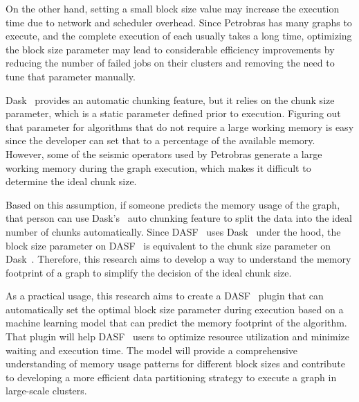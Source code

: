 On the other hand, setting a small block size value may increase the execution time due to network and scheduler overhead.
Since Petrobras has many graphs to execute, and the complete execution of each usually takes a long time, optimizing the block size parameter may lead to considerable efficiency improvements by reducing the number of failed jobs on their clusters and removing the need to tune that parameter manually.

Dask~\cite{dask} provides an automatic chunking feature, but it relies on the chunk size parameter, which is a static parameter defined prior to execution.
Figuring out that parameter for algorithms that do not require a large working memory is easy since the developer can set that to a percentage of the available memory.
However, some of the seismic operators used by Petrobras generate a large working memory during the graph execution, which makes it difficult to determine the ideal chunk size.

Based on this assumption, if someone predicts the memory usage of the graph, that person can use Dask's~\cite{dask} auto chunking feature to split the data into the ideal number of chunks automatically.
Since \ac{DASF}~\cite{dasf} uses Dask~\cite{dask} under the hood, the block size parameter on \ac{DASF}~\cite{dasf} is equivalent to the chunk size parameter on Dask~\cite{dask}.
Therefore, this research aims to develop a way to understand the memory footprint of a graph to simplify the decision of the ideal chunk size.

As a practical usage, this research aims to create a \ac{DASF}~\cite{dasf} plugin that can automatically set the optimal block size parameter during execution based on a machine learning model that can predict the memory footprint of the algorithm.
That plugin will help \ac{DASF}~\cite{dasf} users to optimize resource utilization and minimize waiting and execution time.
The model will provide a comprehensive understanding of memory usage patterns for different block sizes and contribute to developing a more efficient data partitioning strategy to execute a graph in large-scale clusters.
